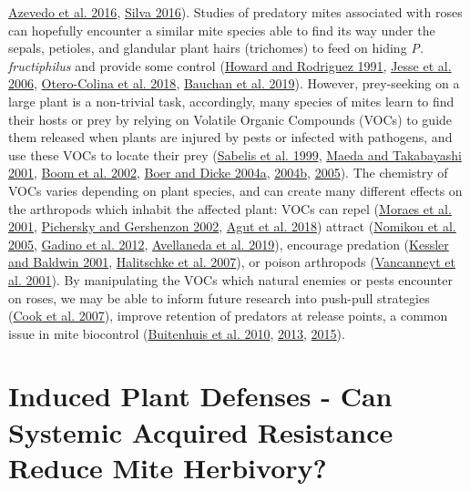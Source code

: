 \documentclass{ufdissertation}[overrideChapters] %
\begin{document}
{\protect\hyperlink{ref-Azevedo2016}{Azevedo et al. 2016}, \protect\hyperlink{ref-Silva2016}{Silva 2016}). Studies of predatory mites associated with roses can hopefully encounter a similar mite species able to find its way under the sepals, petioles, and glandular plant hairs (trichomes) to feed on hiding \emph{P. fructiphilus} and provide some control (\protect\hyperlink{ref-Howard1991}{Howard and Rodriguez 1991}, \protect\hyperlink{ref-Jesse2006}{Jesse et al. 2006}, \protect\hyperlink{ref-Otero-Colina2018}{Otero-Colina et al. 2018}, \protect\hyperlink{ref-Bauchan2019}{Bauchan et al. 2019}). However, prey-seeking on a large plant is a non-trivial task, accordingly, many species of mites learn to find their hosts or prey by relying on Volatile Organic Compounds (VOCs) to guide them released when plants are injured by pests or infected with pathogens, and use these VOCs to locate their prey (\protect\hyperlink{ref-Sabelis1999}{Sabelis et al. 1999}, \protect\hyperlink{ref-Maeda2001}{Maeda and Takabayashi 2001}, \protect\hyperlink{ref-Boom2002}{Boom et al. 2002}, \protect\hyperlink{ref-Boer2004a}{Boer and Dicke 2004a}, \protect\hyperlink{ref-Boer2004b}{2004b}, \protect\hyperlink{ref-Boer2005}{2005}). The chemistry of VOCs varies depending on plant species, and can create many different effects on the arthropods which inhabit the affected plant: VOCs can repel (\protect\hyperlink{ref-Moraes2001}{Moraes et al. 2001}, \protect\hyperlink{ref-Pichersky2002}{Pichersky and Gershenzon 2002}, \protect\hyperlink{ref-Agut2018}{Agut et al. 2018}) attract (\protect\hyperlink{ref-Nomikou2005}{Nomikou et al. 2005}, \protect\hyperlink{ref-Gadino2012}{Gadino et al. 2012}, \protect\hyperlink{ref-Avellaneda2019}{Avellaneda et al. 2019}), encourage predation (\protect\hyperlink{ref-Kessler2001}{Kessler and Baldwin 2001}, \protect\hyperlink{ref-Halitschke2007}{Halitschke et al. 2007}), or poison arthropods (\protect\hyperlink{ref-Vancanneyt2001}{Vancanneyt et al. 2001}). By manipulating the VOCs which natural enemies or pests encounter on roses, we may be able to inform future research into push-pull strategies (\protect\hyperlink{ref-Cook2007}{Cook et al. 2007}), improve retention of predators at release points, a common issue in mite biocontrol (\protect\hyperlink{ref-Buitenhuis2010}{Buitenhuis et al. 2010}, \protect\hyperlink{ref-Buitenhuis2013}{2013}, \protect\hyperlink{ref-Buitenhuis2015}{2015}).

\hypertarget{chemeco}{%
\section{Induced Plant Defenses - Can Systemic Acquired Resistance Reduce Mite Herbivory?}\label{chemeco}}

}
\end{document}
